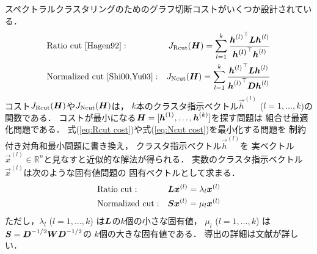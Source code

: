 スペクトラルクラスタリングのためのグラフ切断コストがいくつか設計されている．
\begin{eqnarray}
&\mbox{Ratio cut \cite{Hagen92}}:&
J_{\mbox{\scriptsize Rcut}}(\mbox{\boldmath $H$})=
\sum_{l=1}^k\frac{{\mbox{\boldmath $h$}^{(l)}}^\top\mbox{\boldmath $L$}\mbox{\boldmath $h$}^{(l)}}{\mbox{\boldmath $h^{(l)}$}^\top\mbox{\boldmath $h$}^{(l)}}\label{eq:Rcut cost}\\
&\mbox{Normalized cut \cite{Shi00,Yu03}}:&
J_{\mbox{\scriptsize Ncut}}(\mbox{\boldmath $H$})=
\sum_{l=1}^k\frac{{\mbox{\boldmath $h$}^{(l)}}^\top\mbox{\boldmath $L$}\mbox{\boldmath $h$}^{(l)}}{{\mbox{\boldmath $h$}^{(l)}}^\top\mbox{\boldmath $D$}\mbox{\boldmath $h$}^{(l)}}\label{eq:Ncut cost}
\end{eqnarray}
コスト$J_{\mbox{\scriptsize Rcut}}(\mbox{\boldmath $H$})$や$J_{\mbox{\scriptsize Ncut}}(\mbox{\boldmath $H$})$は，
$k$本のクラスタ指示ベクトル$\vec h^{(l)}$ ($l=1,\dots,k$)の関数である．
コストが最小になる$\mbox{\boldmath $H$}=[\mbox{\boldmath $h$}^{(1)},\dots,\mbox{\boldmath $h$}^{(k)}]$を探す問題は
組合せ最適化問題である．
式(\ref{eq:Rcut cost})や式(\ref{eq:Ncut cost})を最小化する問題を
制約付き対角和最小問題に書き換え，
クラスタ指示ベクトル$\vec h^{(l)}$を
実ベクトル$\vec x^{(l)}\in\mathbb{R}^n$と見なすと近似的な解法が得られる．
実数のクラスタ指示ベクトル$\vec x^{(l)}$は次のような固有値問題の
固有ベクトルとして求まる．
\begin{eqnarray}
&\mbox{Ratio cut}:&
\mbox{\boldmath $L$}\mbox{\boldmath $x$}^{(l)}=\lambda_l\mbox{\boldmath $x$}^{(l)}\\
&\mbox{Normalized cut}:&
\mbox{\boldmath $S$}\mbox{\boldmath $x$}^{(l)}=\mu_l\mbox{\boldmath $x$}^{(l)}
\end{eqnarray}
ただし，$\lambda_l$ ($l=1,\dots,k$) は$\mbox{\boldmath $L$}$の$k$個の小さな固有値，
$\mu_l$ ($l=1,\dots,k$) は$\mbox{\boldmath $S$}=\mbox{\boldmath $D$}^{-1/2}\mbox{\boldmath $W$}\mbox{\boldmath $D$}^{-1/2}$の
$k$個の大きな固有値である．
導出の詳細は文献\cite{Luxburg07}が詳しい．





